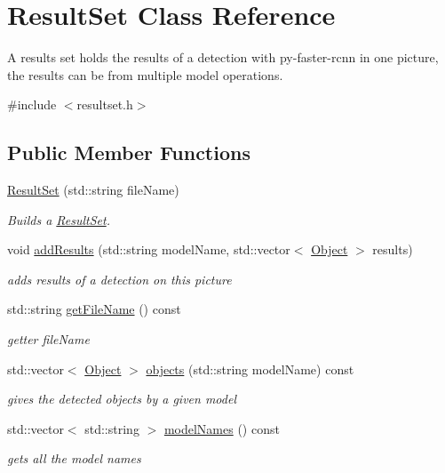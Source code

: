 \hypertarget{class_result_set}{}\section{Result\+Set Class Reference}
\label{class_result_set}


A results set holds the results of a detection with py-\/faster-\/rcnn in one picture, the results can be from multiple model operations.  




{\ttfamily \#include $<$resultset.\+h$>$}

\subsection*{Public Member Functions}
\begin{DoxyCompactItemize}
\item 
\hyperlink{class_result_set_a9069cabfa19771579b8d3208729b426c}{Result\+Set} (std\+::string file\+Name)
\begin{DoxyCompactList}\small\item\em Builds a \hyperlink{class_result_set}{Result\+Set}. \end{DoxyCompactList}\item 
void \hyperlink{class_result_set_ad83bc3196f7a0c7e2052ad85a69c1cd3}{add\+Results} (std\+::string model\+Name, std\+::vector$<$ \hyperlink{class_object}{Object} $>$ results)
\begin{DoxyCompactList}\small\item\em adds results of a detection on this picture \end{DoxyCompactList}\item 
std\+::string \hyperlink{class_result_set_ac7ad652b95be850898dcfdcbc1c58261}{get\+File\+Name} () const 
\begin{DoxyCompactList}\small\item\em getter file\+Name \end{DoxyCompactList}\item 
std\+::vector$<$ \hyperlink{class_object}{Object} $>$ \hyperlink{class_result_set_a7f6c7ba55828add8fb3d1faf64ee8496}{objects} (std\+::string model\+Name) const 
\begin{DoxyCompactList}\small\item\em gives the detected objects by a given model \end{DoxyCompactList}\item 
std\+::vector$<$ std\+::string $>$ \hyperlink{class_result_set_a359649ed63e374f3bbba226bfeee67be}{model\+Names} () const 
\begin{DoxyCompactList}\small\item\em gets all the model names \end{DoxyCompactList}\end{DoxyCompactItemize}


